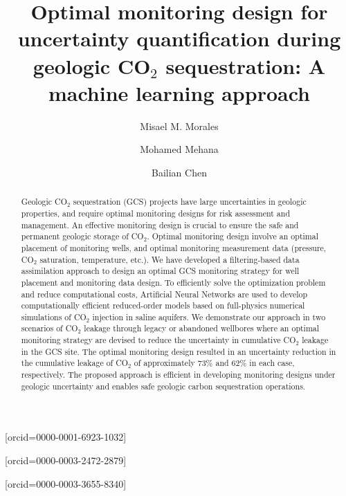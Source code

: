 \documentclass[a4paper,fleqn]{cas-sc}
\begin{document}
\let\WriteBookmarks\relax
\def\floatpagepagefraction{1}
\def\textpagefraction{.001}

\shorttitle{}

\title [mode = title]{Optimal monitoring design for uncertainty quantification during geologic CO$_2$ sequestration: A machine learning approach}                      

\author[1,2]{Misael M. Morales}[orcid=0000-0001-6923-1032]
\cormark[1]

\author[1]{Mohamed Mehana}[orcid=0000-0003-2472-2879]

\author[1]{Bailian Chen}[orcid=0000-0003-3655-8340]




\begin{abstract}
Geologic CO$_2$ sequestration (GCS) projects have large uncertainties in geologic properties, and require optimal monitoring designs for risk assessment and management. An effective monitoring design is crucial to ensure the safe and permanent geologic storage of CO$_2$. Optimal monitoring design involve an optimal placement of monitoring wells, and optimal monitoring measurement data (pressure, CO$_2$ saturation, temperature, etc.). We have developed a filtering-based data assimilation approach to design an optimal GCS monitoring strategy for well placement and monitoring data design. To efficiently solve the optimization problem and reduce computational costs, Artificial Neural Networks are used to develop computationally efficient reduced-order models based on full-physics numerical simulations of CO$_2$ injection in saline aquifers. We demonstrate our approach in two scenarios of CO$_2$ leakage through legacy or abandoned wellbores where an optimal monitoring strategy are devised to reduce the uncertainty in cumulative CO$_2$ leakage in the GCS site. The optimal monitoring design resulted in an uncertainty reduction in the cumulative leakage of CO$_2$ of approximately $73\%$ and $62\%$ in each case, respectively. The proposed approach is efficient in developing monitoring designs under geologic uncertainty and enables safe geologic carbon sequestration operations.
\end{abstract}
\end{document}
